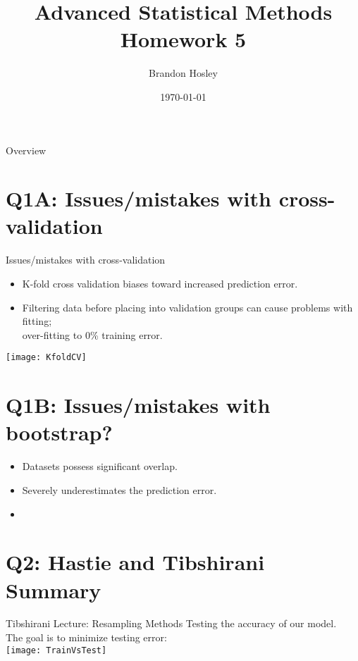 \documentclass{beamer}
\title{Advanced Statistical Methods \\ Homework 5}
\author{Brandon Hosley}
\institute{University of Illinois - Springfield}
\date{\today}
\begin{document}
\frame{\titlepage}

\begin{frame}{Overview}
\tableofcontents
\end{frame}

\section[Q1A]{Q1A: Issues/mistakes with cross-validation}

\begin{frame}{Issues/mistakes with cross-validation}
	\begin{itemize}[<+->]
		\item K-fold cross validation biases toward increased prediction error.
		\item Filtering data before placing into validation groups can cause problems with fitting; \\ over-fitting to 0\% training error.
	\end{itemize}
	\vspace{1em}
	\centering 
	\texttt{[image: KfoldCV]}
	\vspace{1em}
\end{frame}

\section[Q1B]{Q1B: Issues/mistakes with bootstrap?}
\begin{frame}{}
	\begin{itemize}[<+->]
		\item Datasets possess significant overlap.
		\item Severely underestimates the prediction error.
		\item 
	\end{itemize}
\end{frame}

\section[Q2]{Q2: Hastie and Tibshirani Summary}

\begin{frame}{Tibshirani Lecture: Resampling Methods}
	Testing the accuracy of our model. \\
	The goal is to minimize testing error: \\
	\vspace{1em}
	\centering 
	\texttt{[image: TrainVsTest]}
	\vspace{1em}
\end{frame}
\end{document}
